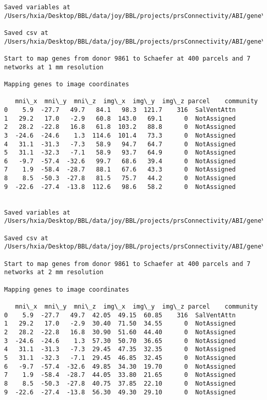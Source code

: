 \documentclass[11pt]{article}
\begin{document}
\begin{Verbatim}[commandchars=\\\{\}]
Saved variables at /Users/hxia/Desktop/BBL/data/joy/BBL/projects/prsConnectivity/ABI/gene\_mapping/9861donor\_200Parcels\_17Network\_2mm.pkl

Saved csv at /Users/hxia/Desktop/BBL/data/joy/BBL/projects/prsConnectivity/ABI/gene\_mapping/9861donor\_200Parcels\_17Network\_2mm.csv

Start to map genes from donor 9861 to Schaefer at 400 parcels and 7 networks at 1 mm resolution

Mapping genes to image coordinates

   mni\_x  mni\_y  mni\_z  img\_x  img\_y  img\_z parcel    community
0    5.9  -27.7   49.7   84.1   98.3  121.7    316  SalVentAttn
1   29.2   17.0   -2.9   60.8  143.0   69.1      0  NotAssigned
2   28.2  -22.8   16.8   61.8  103.2   88.8      0  NotAssigned
3  -24.6  -24.6    1.3  114.6  101.4   73.3      0  NotAssigned
4   31.1  -31.3   -7.3   58.9   94.7   64.7      0  NotAssigned
5   31.1  -32.3   -7.1   58.9   93.7   64.9      0  NotAssigned
6   -9.7  -57.4  -32.6   99.7   68.6   39.4      0  NotAssigned
7    1.9  -58.4  -28.7   88.1   67.6   43.3      0  NotAssigned
8    8.5  -50.3  -27.8   81.5   75.7   44.2      0  NotAssigned
9  -22.6  -27.4  -13.8  112.6   98.6   58.2      0  NotAssigned


Saved variables at /Users/hxia/Desktop/BBL/data/joy/BBL/projects/prsConnectivity/ABI/gene\_mapping/9861donor\_400Parcels\_7Network\_1mm.pkl

Saved csv at /Users/hxia/Desktop/BBL/data/joy/BBL/projects/prsConnectivity/ABI/gene\_mapping/9861donor\_400Parcels\_7Network\_1mm.csv

Start to map genes from donor 9861 to Schaefer at 400 parcels and 7 networks at 2 mm resolution

Mapping genes to image coordinates

   mni\_x  mni\_y  mni\_z  img\_x  img\_y  img\_z parcel    community
0    5.9  -27.7   49.7  42.05  49.15  60.85    316  SalVentAttn
1   29.2   17.0   -2.9  30.40  71.50  34.55      0  NotAssigned
2   28.2  -22.8   16.8  30.90  51.60  44.40      0  NotAssigned
3  -24.6  -24.6    1.3  57.30  50.70  36.65      0  NotAssigned
4   31.1  -31.3   -7.3  29.45  47.35  32.35      0  NotAssigned
5   31.1  -32.3   -7.1  29.45  46.85  32.45      0  NotAssigned
6   -9.7  -57.4  -32.6  49.85  34.30  19.70      0  NotAssigned
7    1.9  -58.4  -28.7  44.05  33.80  21.65      0  NotAssigned
8    8.5  -50.3  -27.8  40.75  37.85  22.10      0  NotAssigned
9  -22.6  -27.4  -13.8  56.30  49.30  29.10      0  NotAssigned



\end{Verbatim}
\end{document}
